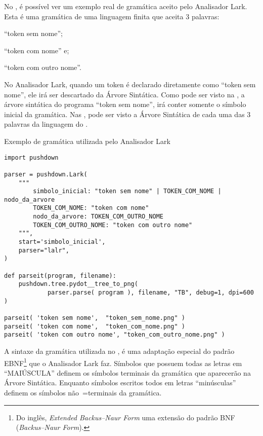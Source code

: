No ,
é possível ver um exemplo real de gramática aceito pelo Analisador Lark.
Esta é uma gramática de uma linguagem finita que aceita 3 palavras:
\begin{inparaenum}[1)]
\item ``token sem nome'';
\item ``token com nome'' e;
\item ``token com outro nome''.
\end{inparaenum}%
No Analisador Lark,
quando um token é declarado diretamente como ``token sem nome'',
ele irá ser descartado da Árvore Sintática.
Como pode ser visto na ,
a árvore sintática do programa ``token sem nome'',
irá conter somente o símbolo inicial da gramática.
Nas ,
pode ser visto a Árvore Sintática de cada uma das 3 palavras da linguagem do .
\begin{code}
\caption{Exemplo de gramática utilizada pelo Analisador Lark}
\label{code:ExemploDeGramaticaLark}
\begin{verbatim}
import pushdown

parser = pushdown.Lark(
    """
        simbolo_inicial: "token sem nome" | TOKEN_COM_NOME | nodo_da_arvore
        TOKEN_COM_NOME: "token com nome"
        nodo_da_arvore: TOKEN_COM_OUTRO_NOME
        TOKEN_COM_OUTRO_NOME: "token com outro nome"
    """,
    start='simbolo_inicial',
    parser="lalr",
)

def parseit(program, filename):
    pushdown.tree.pydot__tree_to_png(
            parser.parse( program ), filename, "TB", debug=1, dpi=600 )

parseit( 'token sem nome',  "token_sem_nome.png" )
parseit( 'token com nome',  "token_com_nome.png" )
parseit( 'token com outro nome', "token_com_outro_nome.png" )
\end{verbatim}
\end{code}

A sintaxe da gramática utilizada no ,
é uma adaptação especial do padrão EBNF\footnote{
Do inglês,
\textit{Extended Backus–Naur Form} uma extensão do padrão BNF (\textit{Backus–Naur Form}).
}
\cite{teachingEbnf,antlrBookTerrentParr,larkGrammarReference,larkStyleCheat} que o Analisador Lark faz.
Símbolos que possuem todas as letras em ``MAIÚSCULA'' definem os símbolos terminais da gramática que aparecerão na Árvore Sintática.
Enquanto símbolos escritos todos em letras ``minúsculas'' definem os símbolos não~=terminais da gramática.

